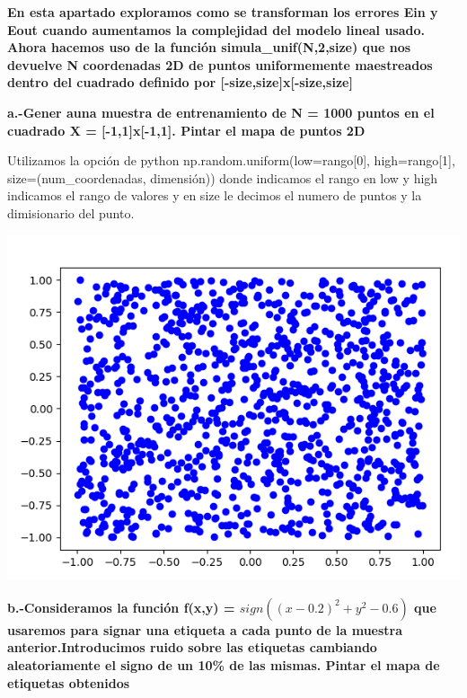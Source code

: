 \documentclass[titlepage]{article}
\begin{document}
	
\newpage

\newpage
	
	\textbf{En esta apartado exploramos como se transforman los errores Ein y Eout cuando aumentamos la complejidad del modelo lineal usado. Ahora hacemos uso de la función simula\_unif(N,2,size) que nos devuelve N coordenadas 2D de puntos uniformemente maestreados dentro del cuadrado definido por [-size,size]x[-size,size]}
	
	\textbf{a.-Gener auna muestra de entrenamiento de N = 1000 puntos en el cuadrado X = [-1,1]x[-1,1]. Pintar el mapa de puntos 2D}
	\newline
	
	Utilizamos la opción de python np.random.uniform(low=rango[0], high=rango[1], size=(num\_coordenadas, dimensión))
	donde indicamos el rango en low y high indicamos el rango de valores y en size le decimos el numero de puntos y la dimisionario del punto.
	
	\begin{center}
		\includegraphics[scale=0.5]{matriz_aleatoria.png}
	\end{center}

	
\newpage
 
 \newpage
	 \textbf{b.-Consideramos la función f(x,y) = $sign((x-0.2)^2 + y^2 - 0.6)$ que usaremos para signar una etiqueta a cada punto de la muestra anterior.Introducimos ruido sobre las etiquetas cambiando aleatoriamente el signo de un 10\% de las mismas. Pintar el mapa de etiquetas obtenidos}
	 
\end{document}
